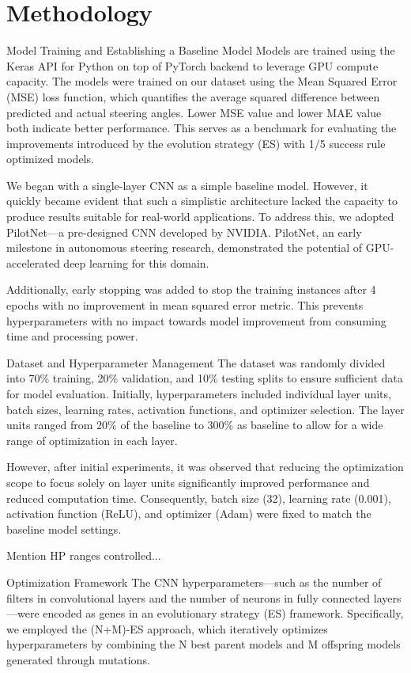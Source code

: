 \documentclass[conference]{IEEEtran}
\begin{document}
\section{Methodology}

Model Training and Establishing a Baseline Model
Models are trained using the Keras API for Python on top of PyTorch backend to leverage GPU compute capacity. The models were trained on our dataset using the Mean Squared Error (MSE) loss function, which quantifies the average squared difference between predicted and actual steering angles. Lower MSE value and lower MAE value both indicate better performance. This serves as a benchmark for evaluating the improvements introduced by the evolution strategy (ES) with 1/5 success rule optimized models.

We began with a single-layer CNN as a simple baseline model. However, it quickly became evident that such a simplistic architecture lacked the capacity to produce results suitable for real-world applications. To address this, we adopted PilotNet—a pre-designed CNN developed by NVIDIA. PilotNet, an early milestone in autonomous steering research, demonstrated the potential of GPU-accelerated deep learning for this domain.

Additionally, early stopping was added to stop the training instances after 4 epochs with no improvement in mean squared error metric. This prevents hyperparameters with no impact towards model improvement from consuming time and processing power.

Dataset and Hyperparameter Management
The dataset was randomly divided into 70\% training, 20\% validation, and 10\% testing splits to ensure sufficient data for model evaluation. Initially, hyperparameters included individual layer units, batch sizes, learning rates, activation functions, and optimizer selection. The layer units ranged from 20\% of the baseline to 300\% as baseline to allow for a wide range of optimization in each layer.

However, after initial experiments, it was observed that reducing the optimization scope to focus solely on layer units significantly improved performance and reduced computation time. Consequently, batch size (32), learning rate (0.001), activation function (ReLU), and optimizer (Adam) were fixed to match the baseline model settings.

Mention HP ranges controlled...

Optimization Framework
The CNN hyperparameters—such as the number of filters in convolutional layers and the number of neurons in fully connected layers—were encoded as genes in an evolutionary strategy (ES) framework. Specifically, we employed the (N+M)-ES approach, which iteratively optimizes hyperparameters by combining the N best parent models and M offspring models generated through mutations.
\end{document}
